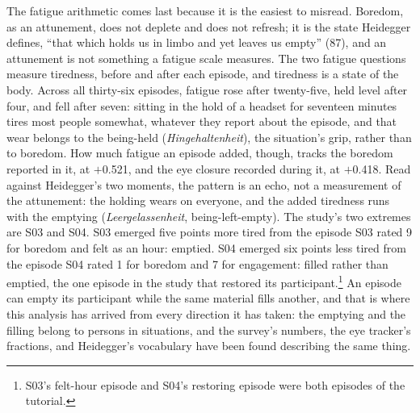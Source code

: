 The fatigue arithmetic comes last because it is the easiest to misread. Boredom, as an
attunement, does not deplete and does not refresh; it is the state Heidegger defines,
``that which holds us in limbo and yet leaves us empty'' (87), and an attunement is not
something a fatigue scale measures. The two fatigue questions measure tiredness, before and
after each episode, and tiredness is a state of the body. Across all thirty-six episodes,
fatigue rose after twenty-five, held level after four, and fell after seven: sitting in the
hold of a headset for seventeen minutes tires most people somewhat, whatever they report
about the episode, and that wear belongs to the being-held (\textit{Hingehaltenheit}), the
situation's grip, rather than to boredom. How much fatigue an episode added, though, tracks
the boredom reported in it, at $+$0.521, and the eye closure recorded during it, at $+$0.418.
Read against Heidegger's two moments, the pattern is an echo, not a measurement of the
attunement: the holding wears on everyone, and the added tiredness runs with the emptying
(\textit{Leergelassenheit}, being-left-empty). The study's two extremes are S03 and S04.
S03 emerged five points more tired from the episode S03 rated 9 for boredom and felt as an
hour: emptied. S04 emerged six points less tired from the episode S04 rated 1 for boredom and
7 for engagement: filled rather than emptied, the one episode in the study that restored its
participant.\footnote{S03's felt-hour episode and S04's restoring episode were both episodes
of the tutorial.} An episode can empty its participant while the same material fills another,
and that is where this analysis has arrived from every direction it has taken: the emptying
and the filling belong to persons in situations, and the survey's numbers, the eye tracker's
fractions, and Heidegger's vocabulary have been found describing the same thing.
